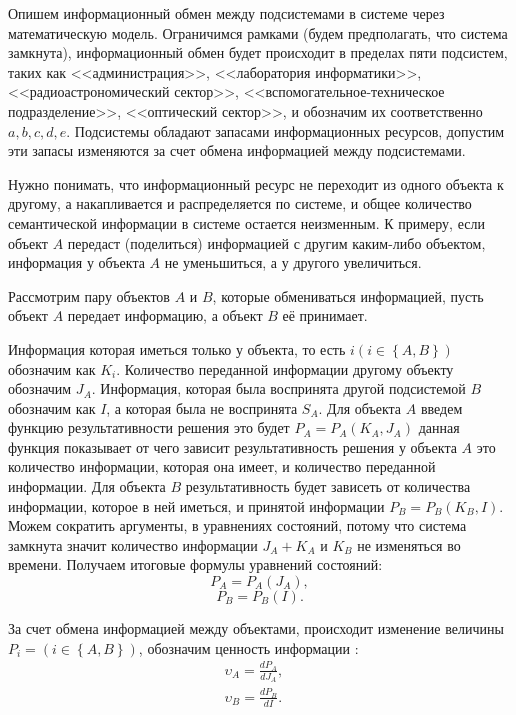 Опишем информационный обмен между подсистемами в системе через математическую модель. Ограничимся рамками (будем предполагать, что система замкнута), информационный обмен будет  происходит в пределах пяти подсистем, таких как <<администрация>>, <<лаборатория информатики>>, <<радиоастрономический сектор>>, <<вспомогательное-техническое подразделение>>, <<оптический сектор>>, и обозначим их соответственно $a, b, c, d, e$. Подсистемы обладают запасами информационных ресурсов, допустим эти запасы изменяются за счет обмена информацией между подсистемами. 

Нужно понимать, что информационный ресурс не переходит из одного объекта к другому, а накапливается и распределяется по системе, и общее количество семантической информации в системе остается неизменным. К примеру, если объект $A$ передаст (поделиться) информацией с другим каким-либо объектом, информация у объекта $A$ не уменьшиться, а у другого увеличиться.

Рассмотрим пару объектов $A$ и $B$, которые обмениваться информацией, пусть объект $A$ передает информацию, а объект $B$ её принимает.

Информация которая иметься только у объекта, то есть  $i \left( i \in \left\{A,B \right\} \right)$ обозначим как $K_i$. Количество переданной информации другому объекту обозначим $J_A$. Информация, которая была воспринята другой подсистемой $B$ обозначим как $I$, а которая была не воспринята $S_A$. Для объекта $A$ введем функцию результативности решения это будет $P_A=P_A(K_A,J_A)$ данная функция показывает от чего зависит результативность решения у объекта $A$ 	это количество информации, которая она имеет, и количество переданной информации. Для объекта $B$ результативность будет зависеть от количества информации, которое в ней иметься, и принятой информации $P_B=P_B(K_B,I)$. 
Можем сократить аргументы, в уравнениях состояний, потому что система замкнута значит количество информации $J_A+K_A$ и $K_B$ не изменяться во времени. Получаем итоговые формулы уравнений состояний:
\begin{equation}\label{eq:sost1}
P_A=P_A(J_A),
\end{equation}
\begin{equation}\label{eq:sost2}
P_B=P_B(I). 
\end{equation}

За счет обмена информацией между объектами, происходит изменение величины $P_i = \left( i \in \left\{A,B \right\} \right)$, обозначим ценность информации :
\begin{equation}\label{eq:cenoostinfo}
\begin{split}
\upsilon_A = \frac{dP_A}{dJ_A}, & \\
\upsilon_B = \frac{dP_B	}{dI}. &
\end{split}
\end{equation}

